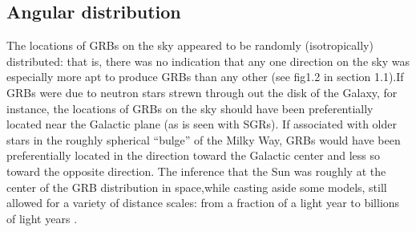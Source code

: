 \subsection{Angular distribution}
The locations of GRBs on the sky appeared to be randomly (isotropically) distributed:
that is, there was no indication that any one direction on the sky was especially
more apt to produce GRBs than any other (see fig1.2 in section 1.1).If GRBs were
due to neutron stars strewn through out the disk of the Galaxy, for instance, the
locations of GRBs on the sky should have been preferentially located near the
Galactic plane (as is seen with SGRs). If associated with older stars in the roughly
spherical “bulge” of the Milky Way, GRBs would have been preferentially located in
the direction toward the Galactic center and less so toward the opposite direction.
The inference that the Sun was roughly at the center of the GRB distribution in
space,while casting aside some models, still allowed for a variety of distance scales: from a fraction of a light year to billions of light years \citep{7}.
